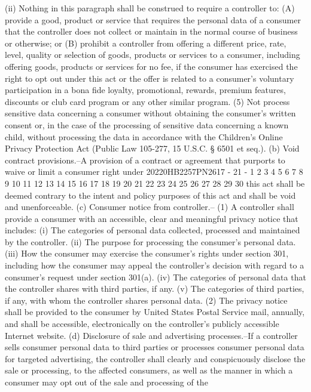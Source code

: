 (ii) Nothing in this paragraph shall be construed to
require a controller to:
(A) provide a good, product or service that
requires the personal data of a consumer that the
controller does not collect or maintain in the normal
course of business or otherwise; or
(B) prohibit a controller from offering a
different price, rate, level, quality or selection of
goods, products or services to a consumer, including
offering goods, products or services for no fee, if
the consumer has exercised the right to opt out under
this act or the offer is related to a consumer's
voluntary participation in a bona fide loyalty,
promotional, rewards, premium features, discounts or
club card program or any other similar program.
(5) Not process sensitive data concerning a consumer
without obtaining the consumer's written consent or, in the
case of the processing of sensitive data concerning a known
child, without processing the data in accordance with the
Children's Online Privacy Protection Act (Public Law 105-277,
15 U.S.C. § 6501 et seq.).
(b) Void contract provisions.--A provision of a contract or
agreement that purports to waive or limit a consumer right under
20220HB2257PN2617 - 21 -
1
2
3
4
5
6
7
8
9
10
11
12
13
14
15
16
17
18
19
20
21
22
23
24
25
26
27
28
29
30
this act shall be deemed contrary to the intent and policy
purposes of this act and shall be void and unenforceable.
(c) Consumer notice from controller.--
(1) A controller shall provide a consumer with an
accessible, clear and meaningful privacy notice that
includes:
(i) The categories of personal data collected,
processed and maintained by the controller.
(ii) The purpose for processing the consumer's
personal data.
(iii) How the consumer may exercise the consumer's
rights under section 301, including how the consumer may
appeal the controller's decision with regard to a
consumer's request under section 301(a).
(iv) The categories of personal data that the
controller shares with third parties, if any.
(v) The categories of third parties, if any, with
whom the controller shares personal data.
(2) The privacy notice shall be provided to the consumer
by United States Postal Service mail, annually, and shall be
accessible, electronically on the controller's publicly
accessible Internet website.
(d) Disclosure of sale and advertising processes.--If a
controller sells consumer personal data to third parties or
processes consumer personal data for targeted advertising, the
controller shall clearly and conspicuously disclose the sale or
processing, to the affected consumers, as well as the manner in
which a consumer may opt out of the sale and processing of the
